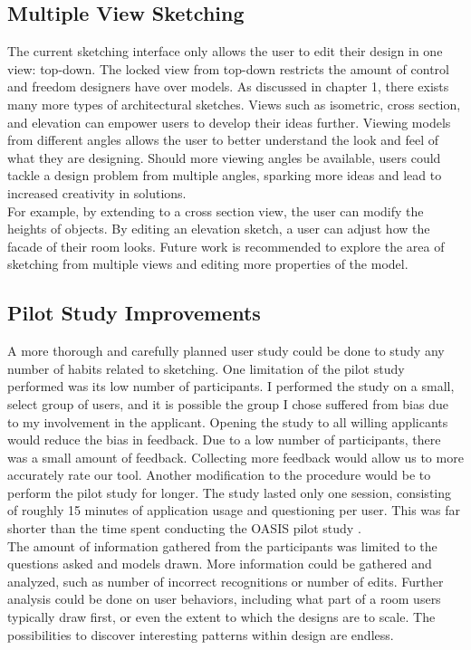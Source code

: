 \subsection{Multiple View Sketching}

The current sketching interface only allows the user to edit their design in one view: top-down. The locked view from top-down restricts the amount of control and freedom designers have over models. As discussed in chapter 1, there exists many more types of architectural sketches. Views such as isometric, cross section, and elevation can empower users to develop their ideas further. Viewing models from different angles allows the user to better understand the look and feel of what they are designing. Should more viewing angles be available, users could tackle a design problem from multiple angles, sparking more ideas and lead to increased creativity in solutions. \\

For example, by extending to a cross section view, the user can modify the heights of objects. By editing an elevation sketch, a user can adjust how the facade of their room looks. Future work is recommended to explore the area of sketching from multiple views and editing more properties of the model.

\subsection{Pilot Study Improvements}

A more thorough and carefully planned user study could be done to study any number of habits related to sketching. One limitation of the pilot study performed was its low number of participants. I performed the study on a small, select group of users, and it is possible the group I chose suffered from bias due to my involvement in the applicant. Opening the study to all willing applicants would reduce the bias in feedback. Due to a low number of participants, there was a small amount of feedback. Collecting more feedback would allow us to more accurately rate our tool. Another modification to the procedure would be to perform the pilot study for longer. The study lasted only one session, consisting of roughly 15 minutes of application usage and questioning per user. This was far shorter than the time spent conducting the OASIS pilot study \cite{oasis2016}. \\

The amount of information gathered from the participants was limited to the questions asked and models drawn. More information could be gathered and analyzed, such as number of incorrect recognitions or number of edits. Further analysis could be done on user behaviors, including what part of a room users typically draw first, or even the extent to which the designs are to scale. The possibilities to discover interesting patterns within design are endless. 

